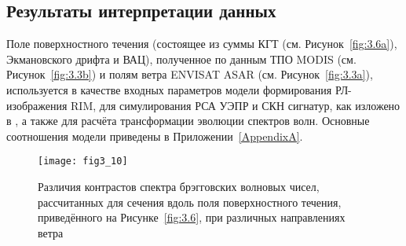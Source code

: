 \subsection{Результаты интерпретации данных} \label{sec:3.3.1}


Поле поверхностного течения (состоящее из суммы КГТ (см. Рисунок~\ref{fig:3.6a}), Экмановского дрифта и ВАЦ), полученное по данным ТПО MODIS (см. Рисунок~\ref{fig:3.3b}) и полям ветра ENVISAT ASAR (см. Рисунок~\ref{fig:3.3a}), используется в качестве входных параметров модели формирования РЛ-изображения RIM, для симулирования РСА УЭПР и СКН сигнатур, как изложено в \citep{Kudryavtsev2005,Johannessen2005}, а также для расчёта трансформации эволюции спектров волн. Основные соотношения модели приведены в Приложении~\ref{AppendixA}. 



\begin{figure}[H]
    \texttt{[image: fig3\_10]}
    \caption{Различия контрастов спектра брэгговских волновых чисел, рассчитанных для сечения вдоль поля поверхностного течения, приведённого на Рисунке~\ref{fig:3.6}, при различных направлениях ветра }
    \label{fig:3.10}
\end{figure}


